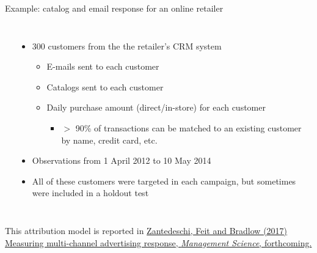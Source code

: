 \documentclass[10pt, aspectratio=169]{beamer}
\begin{document}
\begin{frame}{Example: catalog and email response for an online retailer}
\begin{columns}
\begin{center}
\end{center}
\begin{itemize}
\item 300 customers from the the retailer's CRM system
\begin{itemize}
\item E-mails sent to each customer
\item Catalogs sent to each customer
\item Daily purchase amount (direct/in-store) for each customer
\begin{itemize}
\item $>$ 90\% of transactions can be matched to an existing customer by name, credit card, etc.
\end{itemize}
\end{itemize}
\item Observations from 1 April 2012 to 10 May 2014
\item All of these customers were targeted in each campaign, but sometimes were included in a holdout test
\end{itemize}
\end{columns}
\bigskip \pause
This attribution model is reported in \href{https://drive.google.com/uc?export=download&id=0B0EzanlzLNsWRWZxVTNnZlFsUGc}{Zantedeschi, Feit and Bradlow (2017) Measuring multi-channel advertising response, \emph{Management Science}, forthcoming.} 
\end{frame}
\end{document}
